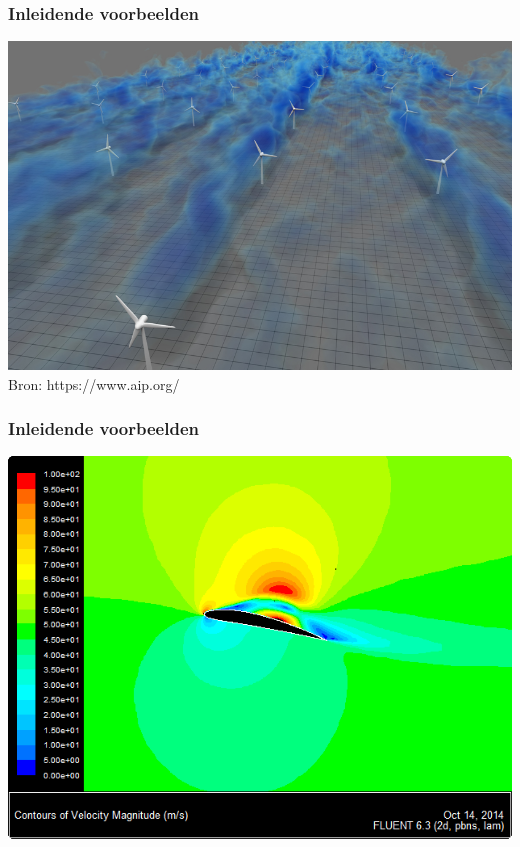 \documentclass[t]{beamer}
\begin{document}
	\begin{frame}
		\frametitle{Inleidende voorbeelden}
		\center
    	\includegraphics[height=0.7\textheight]{../fig/inleiding/JRSE-Stevens-wind_farms}\\
    	\footnotesize{Bron: https://www.aip.org/}
  	\end{frame}
	\begin{frame}
		\frametitle{Inleidende voorbeelden}
		\center
    	\includegraphics[height=0.7\textheight]{../fig/inleiding/NACA4412_velocity_12deg}\\
  	\end{frame}
\end{document}
